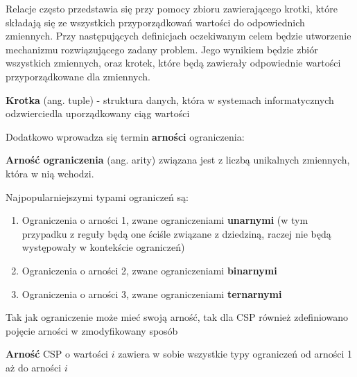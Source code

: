     Relacje często przedstawia się przy pomocy zbioru zawierającego krotki, które składają się ze wszystkich 
    przyporządkowań wartości do odpowiednich zmiennych.
    Przy następujących definicjach oczekiwanym celem będzie utworzenie mechanizmu rozwiązującego zadany problem. Jego wynikiem 
    będzie zbiór wszystkich zmiennych, oraz krotek, które będą zawierały odpowiednie wartości przyporządkowane dla zmiennych.
    \begin{definition}
        \label{Krotka}
        \textbf{Krotka} (ang. tuple) - struktura danych, która w systemach informatycznych odzwierciedla uporządkowany ciąg wartości
    \end{definition}
    Dodatkowo wprowadza się termin \textbf{arności} ograniczenia:
    \begin{definition}
        \label{Krotka}
        \textbf{Arność ograniczenia} (ang. arity)  związana jest z liczbą unikalnych zmiennych, która w nią wchodzi.
    \end{definition}
    Najpopularniejszymi typami ograniczeń są:
    \begin{enumerate}
        \item Ograniczenia o arności 1, zwane ograniczeniami \textbf{unarnymi} (w tym przypadku z reguły będą one ściśle związane z dziedziną, raczej 
        nie będą występowały w kontekście ograniczeń)
        \item Ograniczenia o arności 2, zwane ograniczeniami \textbf{binarnymi}
        \item Ograniczenia o arności 3, zwane ograniczeniami \textbf{ternarnymi}
    \end{enumerate} 

    Tak jak ograniczenie może mieć swoją arność, tak dla CSP również zdefiniowano pojęcie arności w zmodyfikowany sposób 
    \begin{definition}
        \textbf{Arność} CSP o wartości $i$ zawiera w sobie wszystkie typy ograniczeń od arności 1 aż do arności $i$
    \end{definition}

